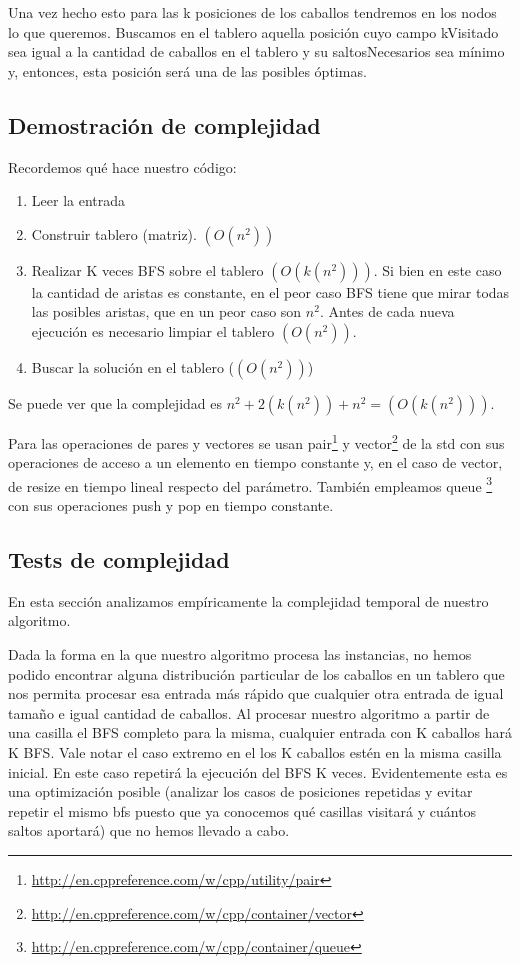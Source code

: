 \documentclass[11pt, a4paper, twoside]{article}
\begin{document}
Una vez hecho esto para las k posiciones de los caballos tendremos en los nodos lo que queremos. Buscamos en el tablero aquella posición cuyo campo kVisitado sea igual a la cantidad de caballos en el tablero y su saltosNecesarios sea mínimo y, entonces, esta posición será una de las posibles óptimas.

\subsection{Demostración de complejidad}

Recordemos qué hace nuestro código:

\begin{enumerate}

\item Leer la entrada
\item Construir tablero (matriz). $(O(n^2))$
\item Realizar K veces BFS sobre el tablero $(O(k(n^2)))$. Si bien en este caso la cantidad de aristas es constante, en el peor caso BFS tiene que mirar todas las posibles aristas, que en un peor caso son $n^2$.  Antes de cada nueva ejecución es necesario limpiar el tablero $(O(n^2))$.
\item Buscar la solución en el tablero ($(O(n^2))$)

\end{enumerate}

Se puede ver que la complejidad es $n^2+2(k(n^2))+n^2 = (O(k(n^2)))$. 

Para las operaciones de pares y vectores se usan pair\footnote{\url{http://en.cppreference.com/w/cpp/utility/pair}} y vector\footnote{\url{http://en.cppreference.com/w/cpp/container/vector}} de la std con sus operaciones de acceso a un elemento en tiempo constante y, en el caso de vector, de resize en tiempo lineal respecto del parámetro. También empleamos queue \footnote{\url{http://en.cppreference.com/w/cpp/container/queue}} con sus operaciones push y pop en tiempo constante.

\subsection{Tests de complejidad}
En esta sección analizamos empíricamente la complejidad temporal de nuestro algoritmo.

Dada la forma en la que nuestro algoritmo procesa las instancias, no hemos podido encontrar alguna distribución particular de los caballos en un tablero que nos permita procesar esa entrada más rápido que cualquier otra entrada de igual tamaño e igual cantidad de caballos. Al procesar nuestro algoritmo a partir de una casilla el BFS completo para la misma, cualquier entrada con K caballos hará K BFS. Vale notar el caso extremo en el los K caballos estén en la misma casilla inicial. En este caso repetirá la ejecución del BFS K veces. 
Evidentemente esta es una optimización posible (analizar los casos de posiciones repetidas y evitar repetir el mismo bfs puesto que ya conocemos qué casillas visitará y cuántos saltos aportará) que no hemos llevado a cabo. 
\end{document}
